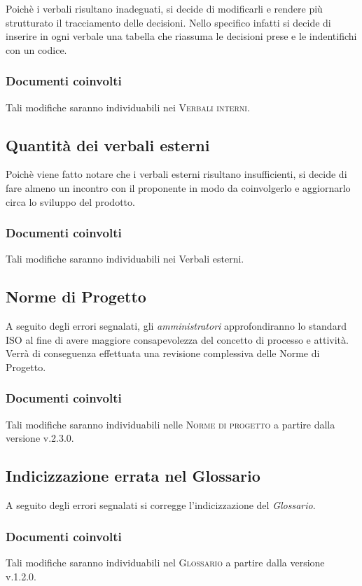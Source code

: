 \documentclass{article}
\begin{document}
Poichè i verbali risultano inadeguati, si decide di modificarli e rendere più strutturato il tracciamento delle decisioni. Nello specifico infatti si decide di inserire
in ogni verbale una tabella che riassuma le decisioni prese e le indentifichi con un codice. 
\subsubsection*{Documenti coinvolti}
Tali modifiche saranno individuabili nei \textsc{Verbali interni}. 

\subsection{Quantità dei verbali esterni}
\label{itm:6}

Poichè viene fatto notare che i verbali esterni risultano insufficienti, si decide di fare almeno un incontro con il proponente in modo da coinvolgerlo e aggiornarlo circa lo sviluppo del prodotto.
\subsubsection*{Documenti coinvolti}
Tali modifiche saranno individuabili nei Verbali esterni.

\subsection{Norme di Progetto}
\label{itm:7}

A seguito degli errori segnalati, gli \emph{amministratori} approfondiranno lo standard ISO al fine di avere maggiore consapevolezza del concetto di processo e attività. Verrà di conseguenza
effettuata una revisione complessiva delle Norme di Progetto.
\subsubsection*{Documenti coinvolti}
Tali modifiche saranno individuabili nelle \textsc{Norme di progetto} a partire dalla versione v.2.3.0.

\subsection{Indicizzazione errata nel Glossario}
\label{itm:7}

A seguito degli errori segnalati si corregge l'indicizzazione del \emph{Glossario}.
\subsubsection*{Documenti coinvolti}
Tali modifiche saranno individuabili nel \textsc{Glossario} a partire dalla versione v.1.2.0.
\end{document}
